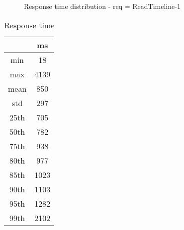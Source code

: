 \begin{minipage}{0.75\linewidth}
\begin{figure}[h]
\begin{adjustbox}{max width=1.0\linewidth, keepaspectratio}
  \end{adjustbox}
  \caption{Response time distribution - req = ReadTimeline-1}
\end{figure}
\end{minipage}\hfill\begin{minipage}{0.18\linewidth}
\begin{table}[h]
\begin{tabular}{|cc|}
\hline
\textbf{} & \textbf{ms}\\ \hline
 \Xhline{0.005\arrayrulewidth}
min & 18\\
 \Xhline{0.005\arrayrulewidth}
max & 4139\\
 \Xhline{0.005\arrayrulewidth}
mean & 850\\
 \Xhline{0.005\arrayrulewidth}
std & 297\\
\hline
\hline
 \Xhline{0.005\arrayrulewidth}
25th & 705\\
 \Xhline{0.005\arrayrulewidth}
50th & 782\\
 \Xhline{0.005\arrayrulewidth}
75th & 938\\
 \Xhline{0.005\arrayrulewidth}
80th & 977\\
 \Xhline{0.005\arrayrulewidth}
85th & 1023\\
 \Xhline{0.005\arrayrulewidth}
90th & 1103\\
 \Xhline{0.005\arrayrulewidth}
95th & 1282\\
 \Xhline{0.005\arrayrulewidth}
99th & 2102\\
\hline
\end{tabular}
\caption{Response time}
\end{table}
\end{minipage}\hfill